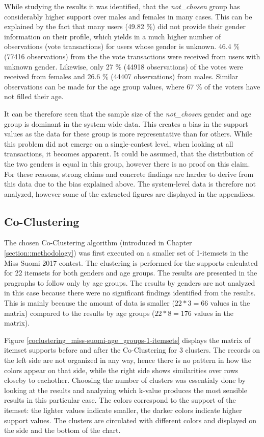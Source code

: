 While studying the results it was identified, that the \emph{not\_chosen} group has considerably higher support over males and females in many cases. This can be explained by the fact that many users (49.82 \%) did not provide their gender information on their profile, which yields in a much higher number of observations (vote transactions) for users whose gender is unknown. 46.4 \% (77416 observations) from the the vote transactions were received from users with unknown gender. Likewise, only 27 \% (44918 observations) of the votes were received from females and 26.6 \% (44407 observations) from males. Similar observations can be made for the age group values, where 67 \% of the voters have not filled their age. 

It can be therefore seen that the sample size of the \emph{not\_chosen} gender and age group is dominant in the system-wide data. This creates a bias in the support values as the data for these group is more representative than for others. While this problem did not emerge on a single-contest level, when looking at all transactions, it becomes apparent. It could be assumed, that the distribution of the two genders is equal in this group, however there is no proof on this claim. For these reasons, strong claims and concrete findings are harder to derive from this data due to the bias explained above. The system-level data is therefore not analyzed, however some of the extracted figures are displayed in the appendices. 

\subsection{Co-Clustering}
The chosen Co-Clustering algorithm (introduced in Chapter \ref{section::methodology}) was first executed on a smaller set of 1-itemsets in the Miss Suomi 2017 contest. The clustering is performed for the supports calculated for 22 itemsets for both genders and age groups. The results are presented in the pragraphs to follow only by age groups. The results by genders are not analyzed in this case because there were no significant findings identified from the results. This is mainly because the amount of data is smaller ($22*3=66$ values in the matrix) compared to the results by age groups ($22*8=176$ values in the matrix). 

Figure \ref{coclustering_miss-suomi-age_groups-1-itemsets} displays the matrix of itemset supports before and after the Co-Clustering for 3 clusters. The records on the left side are not organized in any way, hence there is no pattern in how the colors appear on that side, while the right side shows similarities over rows closeby to eachother. Choosing the number of clusters was essentialy done by looking at the results and analyzing which k-value produces the most sensible results in this particular case. The colors correspond to the support of the itemset: the lighter values indicate smaller, the darker colors indicate higher support values. The clusters are circulated with different colors and displayed on the side and the bottom of the chart. 

